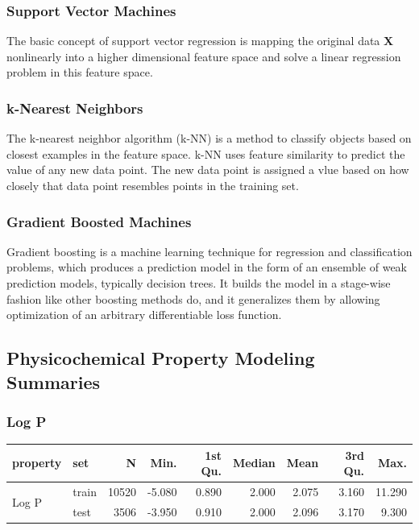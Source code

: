 \documentclass[10pt, letter]{article}
\renewcommand{\=}{\, =\, }
\newcommand{\+}{\, +\, }
\renewcommand{\-}{\, -\, }
\begin{document}
\subsubsection{Support Vector Machines}
The basic concept of support vector regression is mapping the original data \textbf{X} nonlinearly into a higher dimensional feature space and solve a linear regression problem in this feature space.

\subsubsection{k-Nearest Neighbors}
The k-nearest neighbor algorithm (k-NN) is a method to classify objects based on closest examples in the feature space.
k-NN uses feature similarity to predict the value of any new data point. The new data point is assigned a vlue based on how closely that data point resembles points in the training set.

\subsubsection{Gradient Boosted Machines}
Gradient boosting is a machine learning technique for regression and classification problems, which produces a prediction model in the form of an ensemble of weak prediction models, typically decision trees. It builds the model in a stage-wise fashion like other boosting methods do, and it generalizes them by allowing optimization of an arbitrary differentiable loss function.

\newpage

\subsection{Physicochemical Property Modeling Summaries}

\subsubsection{Log P}

\begin{table}[H]
\begin{center}
\begin{tabular}{llrrrrrrr}
\toprule
{\bf property} & {\bf set} & {\bf N} & {\bf Min.} & {\bf 1st Qu.} &  {\bf Median}  & {\bf Mean}  & {\bf 3rd Qu.} & {\bf Max.}\\
\midrule
\multirow{2}{15mm}{Log P}
& train &  10520 & -5.080 & 0.890 & 2.000 & 2.075 & 3.160 & 11.290\\
& test &  3506 & -3.950 & 0.910 & 2.000 & 2.096 & 3.170 & 9.300\\
\midrule
\hline
\end{tabular}
\end{center}
\end{table}
\end{document}
